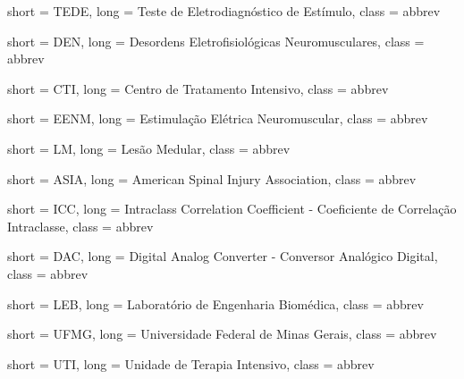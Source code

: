  {
	short = TEDE,
	long = Teste de Eletrodiagnóstico de Estímulo,
	class = abbrev
}

 {
	short = DEN,
	long = Desordens Eletrofisiológicas Neuromusculares,
	class = abbrev
}

 {
	short = CTI,
	long = Centro de Tratamento Intensivo,
	class = abbrev
}

 {
	short = EENM,
	long =  Estimulação Elétrica Neuromuscular,
	class = abbrev
}

 {
	short = LM,
	long =  Lesão Medular,
	class = abbrev
}

 {
	short = ASIA,
	long =  American Spinal Injury Association,
	class = abbrev
}

 {
	short = ICC,
	long =  Intraclass Correlation Coefficient - Coeficiente de Correlação Intraclasse,
	class = abbrev
}

 {
	short = DAC,
	long =  Digital Analog Converter - Conversor Analógico Digital,
	class = abbrev
}

 {
	short = LEB,
	long =  Laboratório de Engenharia Biomédica,
	class = abbrev
}

 {
	short = UFMG,
	long =  Universidade Federal de Minas Gerais,
	class = abbrev
}

 {
	short = UTI,
	long =  Unidade de Terapia Intensivo,
	class = abbrev
}